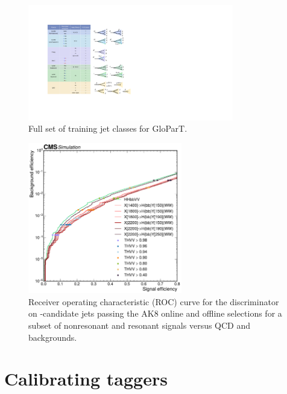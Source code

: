 \begin{figure}[htb!]
    \centering
    \captionsetup{justification=centering}
    \includegraphics[width=0.8\textwidth]{figures/05-HH/part/classes_stage1.pdf}
    \caption{Full set of training jet classes for GloParT.}
    \label{fig:05_part_classes}
\end{figure}



\begin{figure}[htb!]
    \centering
    \includegraphics[width=0.6\textwidth]{figures/05-HH/part/roccurve_allsigs_thvv4qt_pt_300_3000.pdf}
    \caption{Receiver operating characteristic (ROC) curve for the \THWW discriminator on \VV-candidate jets passing the AK8 online and offline selections for a subset of nonresonant and resonant signals versus QCD and \ttbar backgrounds.}
    \label{fig:05_part_roc}
\end{figure}

\section{Calibrating \texorpdfstring{\hyvv}{H/Y→VV} taggers}
\label{sec:05_hww_calibration}


